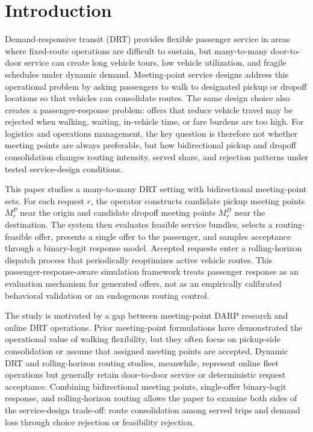\section{Introduction}
\label{sec:intro}

Demand-responsive transit (DRT) provides flexible passenger service in areas where
fixed-route operations are difficult to sustain, but many-to-many door-to-door service
can create long vehicle tours, low vehicle utilization, and fragile schedules under
dynamic demand. Meeting-point service designs address this operational problem by asking
passengers to walk to designated pickup or dropoff locations so that vehicles can
consolidate routes. The same design choice also creates a passenger-response problem:
offers that reduce vehicle travel may be rejected when walking, waiting, in-vehicle
time, or fare burdens are too high. For logistics and operations management, the key
question is therefore not whether meeting points are always preferable, but how
bidirectional pickup and dropoff consolidation changes routing intensity, served share,
and rejection patterns under tested service-design conditions.

This paper studies a many-to-many DRT setting with bidirectional meeting-point sets.
For each request $r$, the operator constructs candidate pickup meeting points
$M_r^P$ near the origin and candidate dropoff meeting points $M_r^D$ near the
destination. The system then evaluates feasible service bundles, selects a routing-feasible
offer, presents a single offer to the passenger, and samples acceptance through a
binary-logit response model. Accepted requests enter a rolling-horizon dispatch process
that periodically reoptimizes active vehicle routes. This passenger-response-aware
simulation framework treats passenger response as an evaluation mechanism for generated
offers, not as an empirically calibrated behavioral validation or an endogenous routing
control.

The study is motivated by a gap between meeting-point DARP research and online DRT
operations. Prior meeting-point formulations have demonstrated the operational value of
walking flexibility, but they often focus on pickup-side consolidation or assume that
assigned meeting points are accepted. Dynamic DRT and rolling-horizon routing studies,
meanwhile, represent online fleet operations but generally retain door-to-door service or
deterministic request acceptance. Combining bidirectional meeting points, single-offer
binary-logit response, and rolling-horizon routing allows the paper to examine both sides
of the service-design trade-off: route consolidation among served trips and demand loss
through choice rejection or feasibility rejection.

